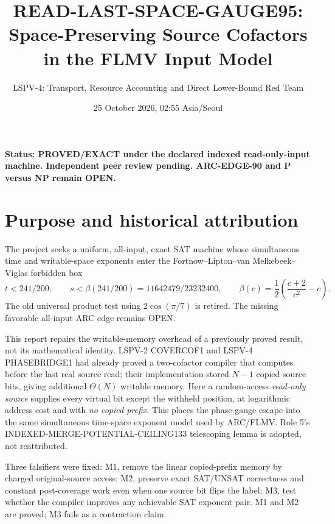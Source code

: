 \documentclass[11pt]{article}
\title{READ-LAST-SPACE-GAUGE95: Space-Preserving Source Cofactors in the FLMV Input Model}
\author{LSPV-4: Transport, Resource Accounting and Direct Lower-Bound Red Team}
\date{25 October 2026, 02:55 Asia/Seoul}
\begin{document}
\maketitle

\noindent\textbf{Status: PROVED/EXACT under the declared indexed read-only-input machine. Independent peer review pending. ARC-EDGE-90 and P versus NP remain OPEN.}

\section{Purpose and historical attribution}
The project seeks a uniform, all-input, exact SAT machine whose simultaneous time and writable-space exponents enter the Fortnow--Lipton--van Melkebeek--Viglas forbidden box
\[
t<241/200,\qquad s<\beta(241/200)=11642479/23232400,\qquad
\beta(c)=\frac12\left(\frac{c+2}{c^2}-c\right).
\]
The old universal product test using $2\cos(\pi/7)$ is retired. The missing favorable all-input ARC edge remains OPEN.

This report repairs the writable-memory overhead of a previously proved result, not its mathematical identity. LSPV-2 COVERCOF1 and LSPV-4 PHASEBRIDGE1 had already proved a two-cofactor compiler that computes before the last real source read; their implementation stored $N-1$ copied source bits, giving additional $\Theta(N)$ writable memory. Here a random-access \emph{read-only source} supplies every virtual bit except the withheld position, at logarithmic address cost and with \emph{no copied prefix}. This places the phase-gauge escape into the same simultaneous time-space exponent model used by ARC/FLMV. Role 5's INDEXED-MERGE-POTENTIAL-CEILING133 telescoping lemma is adopted, not reattributed.

Three falsifiers were fixed: M1, remove the linear copied-prefix memory by charged original-source access; M2, preserve exact SAT/UNSAT correctness and constant post-coverage work even when one source bit flips the label; M3, test whether the compiler improves any achievable SAT exponent pair. M1 and M2 are proved; M3 fails as a contraction claim.
\end{document}
